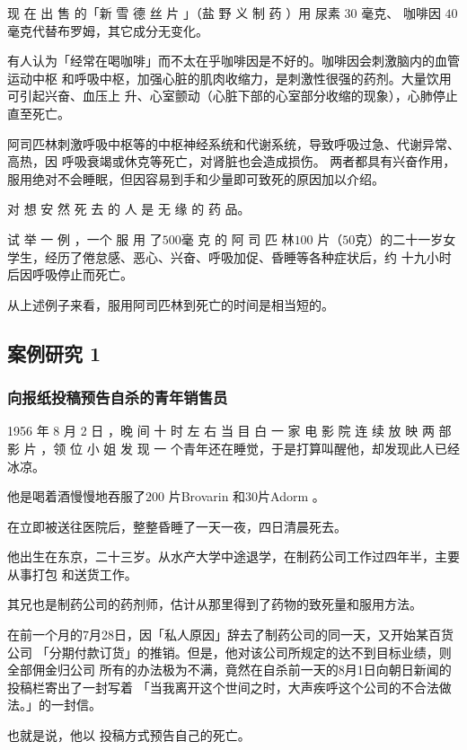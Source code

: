 \documentclass[UTF8]{ctexart}
\begin{document}
现 在 出 售 的「新 雪 德 丝 片 」（盐 野 义 制 药 ）用 尿素 $30$ 毫克、
咖啡因 $40$ 毫克代替布罗姆，其它成分无变化。

有人认为「经常在喝咖啡」而不太在乎咖啡因是不好的。咖啡因会刺激脑内的血管运动中枢
和呼吸中枢，加强心脏的肌肉收缩力，是刺激性很强的药剂。大量饮用可引起兴奋、血压上
升、心室颤动（心脏下部的心室部分收缩的现象），心肺停止直至死亡。

阿司匹林刺激呼吸中枢等的中枢神经系统和代谢系统，导致呼吸过急、代谢异常、高热，因 呼吸衰竭或休克等死亡，对肾脏也会造成损伤。 
两者都具有兴奋作用，服用绝对不会睡眠，但因容易到手和少量即可致死的原因加以介绍。

对 想 安 然 死 去 的 人 是 无 缘 的 药 品。

试 举 一 例 ，一个 服 用 了$500$毫 克 的 阿 司 匹 林$100$ 片（$50$克）的二十一岁女学生，经历了倦怠感、恶心、兴奋、呼吸加促、昏睡等各种症状后，约 十九小时后因呼吸停止而死亡。

从上述例子来看，服用阿司匹林到死亡的时间是相当短的。

\subsection{案例研究 1}

\subsubsection*{向报纸投稿预告自杀的青年销售员}

1956 年 8 月 2 日 ，晚 间 十 时 左 右 当 目 白 一 家 电 影 院 连 续 放 映 两 部 影 片 ，领 位 小 姐 发 现 一 个青年还在睡觉，于是打算叫醒他，却发现此人已经冰凉。

他是喝着酒慢慢地吞服了$200$ 片Brovarin 和$30$片Adorm 。

在立即被送往医院后，整整昏睡了一天一夜，四日清晨死去。

他出生在东京，二十三岁。从水产大学中途退学，在制药公司工作过四年半，主要从事打包 和送货工作。

其兄也是制药公司的药剂师，估计从那里得到了药物的致死量和服用方法。

在前一个月的7月28日，因「私人原因」辞去了制药公司的同一天，又开始某百货公司 「分期付款订货」的推销。但是，他对该公司所规定的达不到目标业绩，则全部佣金归公司 所有的办法极为不满，竟然在自杀前一天的8月1日向朝日新闻的投稿栏寄出了一封写着 「当我离开这个世间之时，大声疾呼这个公司的不合法做法。」的一封信。

也就是说，他以 投稿方式预告自己的死亡。
\end{document}
